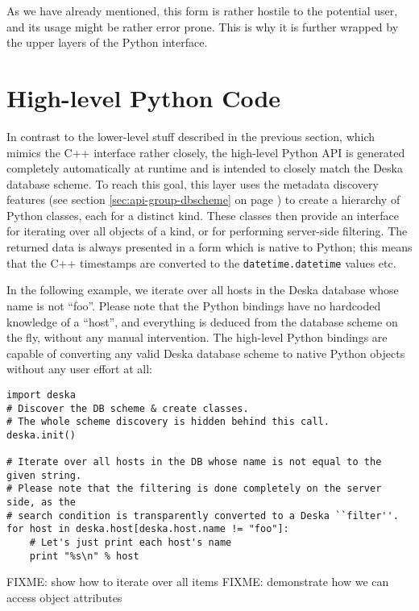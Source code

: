 \documentclass[deska]{subfiles}
\begin{document}
As we have already mentioned, this form is rather hostile to the potential user, and its usage might be rather error
prone.  This is why it is further wrapped by the upper layers of the Python interface.

\section{High-level Python Code}

In contrast to the lower-level stuff described in the previous section, which mimics the C++ interface rather closely,
the high-level Python API is generated completely automatically at runtime and is intended to closely match the Deska
database scheme.  To reach this goal, this layer uses the metadata discovery features (see section
\ref{sec:api-group-dbscheme} on page \pageref{sec:api-group-dbscheme}) to create a hierarchy of Python classes, each for
a distinct kind.  These classes then provide an interface for iterating over all objects of a kind, or for performing
server-side filtering.  The returned data is always presented in a form which is native to Python; this means that the
C++ timestamps are converted to the {\tt datetime.datetime} values etc.

In the following example, we iterate over all hosts in the Deska database whose name is not ``foo''.  Please note that
the Python bindings have no hardcoded knowledge of a ``host'', and everything is deduced from the database scheme on the
fly, without any manual intervention.  The high-level Python bindings are capable of converting any valid Deska database
scheme to native Python objects without any user effort at all:

\begin{verbatim}
import deska
# Discover the DB scheme & create classes.
# The whole scheme discovery is hidden behind this call.
deska.init()

# Iterate over all hosts in the DB whose name is not equal to the given string.
# Please note that the filtering is done completely on the server side, as the
# search condition is transparently converted to a Deska ``filter''.
for host in deska.host[deska.host.name != "foo"]:
    # Let's just print each host's name
    print "%s\n" % host
\end{verbatim}

FIXME: show how to iterate over all items
FIXME: demonstrate how we can access object attributes
\end{document}
